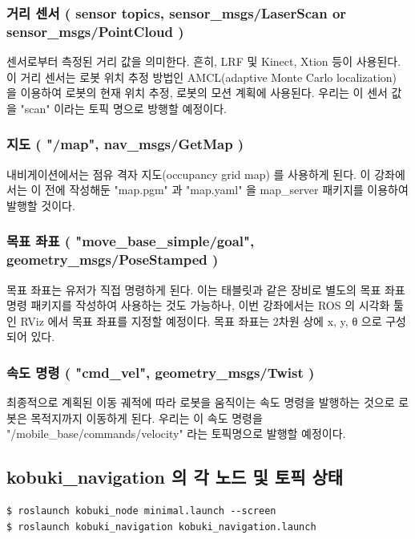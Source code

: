 \subsubsection{거리 센서 ( sensor topics, sensor\_msgs/LaserScan or sensor\_msgs/PointCloud  )}
센서로부터 측정된 거리 값을 의미한다. 흔히, LRF 및 Kinect, Xtion 등이 사용된다. 이 거리 센서는 로봇 위치 추정 방법인 AMCL(adaptive Monte Carlo localization) 을 이용하여 로봇의 현재 위치 추정, 로봇의 모션 계획에 사용된다. 우리는 이 센서 값을 "scan" 이라는 토픽 명으로 방행할 예정이다.

\subsubsection{지도 ( "/map", nav\_msgs/GetMap )}
내비게이션에서는 점유 격자 지도(occupancy grid map) 를 사용하게 된다. 이 강좌에서는 이 전에 작성해둔 "map.pgm" 과 "map.yaml" 을 map\_server 패키지를 이용하여 발행할 것이다. 

\subsubsection{목표 좌표 ( "move\_base\_simple/goal", geometry\_msgs/PoseStamped )}
목표 좌표는 유저가 직접 명령하게 된다. 이는 태블릿과 같은 장비로 별도의 목표 좌표 명령 패키지를 작성하여 사용하는 것도 가능하나, 이번 강좌에서는 ROS 의 시각화 툴인 RViz 에서 목표 좌표를 지정할 예정이다. 목표 좌표는 2차원 상에 x, y, θ 으로 구성되어 있다.

\subsubsection{속도 명령 ( "cmd\_vel", geometry\_msgs/Twist )}
최종적으로 계획된 이동 궤적에 따라 로봇을 움직이는 속도 명령을 발행하는 것으로 로봇은 목적지까지 이동하게 된다. 우리는 이 속도 명령을 "/mobile\_base/commands/velocity" 라는 토픽명으로 발행할 예정이다.


\subsection{kobuki\_navigation 의 각 노드 및 토픽 상태}

\vspace{\baselineskip}
\begin{lstlisting}[language=ROS]
$ roslaunch kobuki_node minimal.launch --screen
$ roslaunch kobuki_navigation kobuki_navigation.launch
\end{lstlisting}


